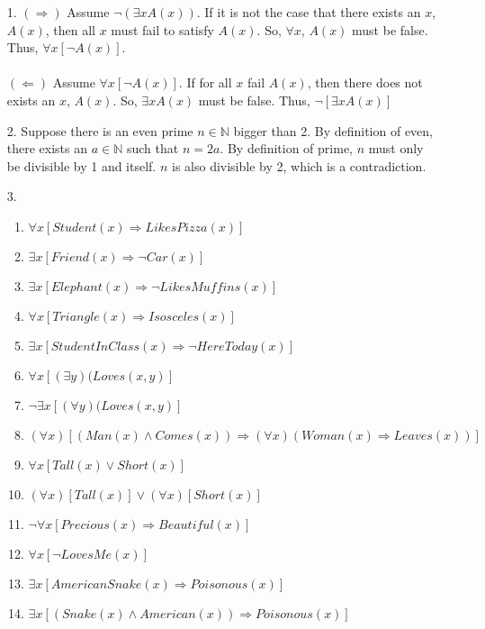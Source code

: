 \documentclass[11pt]{exam}
\author{@dante}
\begin{document}

\begin{enumerate}[leftmargin=0pt]

\item[1.] $(\Rightarrow)$ Assume $\neg (\exists x A(x))$. If it is not the case that there exists an $x$, $A(x)$, then all $x$ must fail to satisfy $A(x)$. So, $\forall x$, $A(x)$ must be false. Thus, $\forall x [\neg A(x)]$. \\
\\
$(\Leftarrow)$ Assume $\forall x [\neg A(x)]$. If for all $x$ fail $A(x)$, then there does not exists an $x$, $A(x)$. So, $\exists x A(x)$ must be false. Thus, $\neg [\exists x A(x)]$

\item[2.] Suppose there is an even prime $n \in \mathbb{N}$ bigger than 2. By definition of even, there exists an $a \in \mathbb{N}$ such that $n = 2a$. By definition of prime, $n$ must only be divisible by 1 and itself. $n$ is also divisible by 2, which is a contradiction.

\item[3.]
\begin{enumerate}[label=(\alph*)]
    \item $\forall x [Student(x) \Rightarrow LikesPizza(x)]$
    \item $\exists x [Friend(x) \Rightarrow \neg Car(x)]$
    \item $\exists x [Elephant(x) \Rightarrow \neg LikesMuffins(x)]$
    \item $\forall x [Triangle(x) \Rightarrow Isosceles(x)]$
    \item $\exists x [StudentInClass(x) \Rightarrow \neg HereToday(x)]$
    \item $\forall x [(\exists y)(Loves(x,y)]$
    \item $\neg \exists x [(\forall y)(Loves(x,y)]$
    \item $(\forall x)[(Man(x) \land Comes(x)) \Rightarrow (\forall x)(Woman(x) \Rightarrow Leaves(x))]$
    \item $\forall x [Tall(x) \lor Short(x)]$
    \item $(\forall x)[Tall(x)] \lor (\forall x)[Short(x)]$
    \item $\neg \forall x [Precious(x) \Rightarrow Beautiful(x)]$
    \item $\forall x [\neg LovesMe(x)]$
    \item $\exists x [AmericanSnake(x) \Rightarrow Poisonous(x)]$
    \item $\exists x [(Snake(x) \land American(x)) \Rightarrow Poisonous(x)]$
\end{enumerate}


\end{enumerate}
\end{document}
